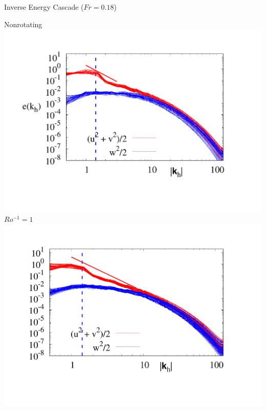 \documentclass[aspecttatio=169]{beamer}
\begin{document}
\begin{frame}{Inverse Energy Cascade ($Fr = 0.18$)}

        \centering
        {\small Nonrotating}
        \includegraphics[width=.91\textwidth]{images/B30Spec.pdf}
    \emp
        \centering
        {\small $Ro^{-1} = 1$}
        \includegraphics[width=.99\textwidth]{images/Om1Spec.pdf}
    \emp


\end{frame}
\end{document}
